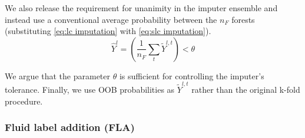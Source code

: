 \documentclass[conference,compsoc]{IEEEtran}
\begin{document}
We also release the requirement for unanimity in the imputer ensemble and instead use a conventional average probability between the $n_F$ forests (substituting \autoref{eq:lc imputation} with \autoref{eq:slc imputation}).
%
\begin{equation}
    \hat Y^l = \left(\frac{1}{n_F}\sum_t\tilde Y^{l,t}\right) < \theta
    \label{eq:slc imputation}    
\end{equation}
%

We argue that the parameter $\theta$ is sufficient for controlling the imputer's tolerance. Finally, we use OOB probabilities as $\tilde Y^{l, t}$ rather than the original k-fold procedure.




\subsubsection{Fluid label addition (FLA)}  %
\label{sec:fla}
\end{document}

